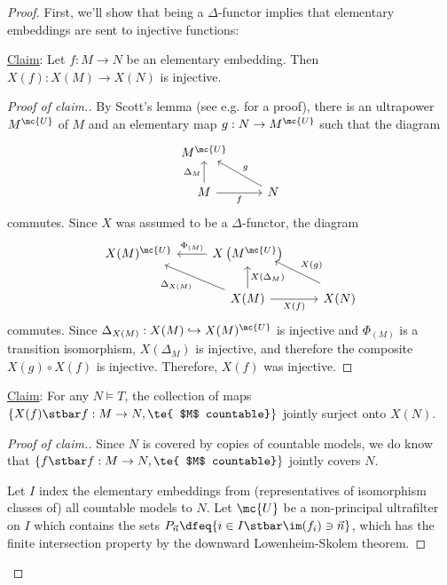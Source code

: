 \begin{proof}
First, we'll show that being a $\Delta$-functor implies that elementary embeddings are sent to injective functions:
  
  \begin{description}
  \item \ul{Claim}: Let $f : M \to N$ be an elementary embedding. Then $X(f) : X(M) \to X(N)$ is injective.

    \item \begin{proof}[Proof of claim.]
      By Scott's lemma (see e.g. \cite{bell-slomson-model-theory} for a proof), there is an ultrapower $M^{\mc{U}}$ of $M$ and an elementary map $g : N \to M^{\mc{U}}$ such that the diagram
$$      \begin{tikzcd}[ampersand replacement = \&]
   M^{\mc{U}}        \& \\
      M \arrow{u}{\Delta_M} \arrow[swap]{r}{f}  \& N \arrow[swap]{ul}{g}
    \end{tikzcd}
    $$
    commutes. Since $X$ was assumed to be a $\Delta$-functor, the diagram
    $$
    \begin{tikzcd}[ampersand replacement = \&]
    X(M)^{\mc{U}} \& \arrow[swap]{l}{\Phi_{(M)}} X\left(M^{\mc{U}}\right) \& \\
      \& X(M)  \arrow[swap]{u}{X(\Delta_M)} \arrow[swap]{r}{X(f)} \arrow{ul}{\Delta_{X(M)}} \& X(N) \arrow[swap, shift right=1.1ex]{ul}{X(g)}
      \end{tikzcd}
    $$
    commutes. Since $\Delta_{X(M)} : X(M) \hookrightarrow X(M)^{\mc{U}}$ is injective and $\Phi_{(M)}$ is a transition isomorphism, $X(\Delta_M)$ is injective, and therefore the composite $X(g) \circ X(f)$ is injective. Therefore, $X(f)$ was injective.
      \end{proof}
    \end{description}

    \begin{description}
    \item \ul{Claim}: For any $N \models T$, the collection of maps $\{X(f) \stbar f : M \to N, \te{ $M$ countable}\}$ jointly surject onto $X(N)$.
    \item \begin{proof}[Proof of claim.]
        Since $N$ is covered by copies of countable models, we do know that $\{f \stbar f : M \to N, \te{ $M$ countable}\}$ jointly covers $N$.

        Let $I$ index the elementary embeddings from (representatives of isomorphism classes of) all countable models to $N$. Let $\mc{U}$ be a non-principal ultrafilter on $I$ which contains the sets $P_{\vec{n}} \dfeq \{i \in I \stbar \im(f_i) \ni \vec{n}\}$, which has the finite intersection property by the downward Lowenheim-Skolem theorem.
        

\end{proof}
\end{description}
\end{proof}
